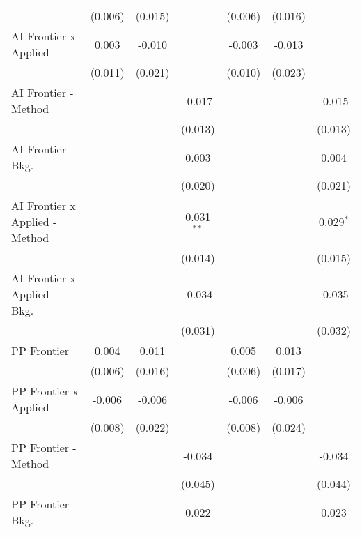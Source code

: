 \begin{tabular}{lcccccc}
                                  & (0.006) & (0.015)     &                & (0.006) & (0.016)  &   \\   
   AI Frontier x Applied          & 0.003   & -0.010      &                & -0.003  & -0.013   &   \\   
                                  & (0.011) & (0.021)     &                & (0.010) & (0.023)  &   \\   
   AI Frontier - Method           &         &             & -0.017         &         &          & -0.015\\   
                                  &         &             & (0.013)        &         &          & (0.013)\\   
   AI Frontier - Bkg.             &         &             & 0.003          &         &          & 0.004\\   
                                  &         &             & (0.020)        &         &          & (0.021)\\   
   AI Frontier x Applied - Method &         &             & 0.031$^{**}$   &         &          & 0.029$^{*}$\\   
                                  &         &             & (0.014)        &         &          & (0.015)\\   
   AI Frontier x Applied - Bkg.   &         &             & -0.034         &         &          & -0.035\\   
                                  &         &             & (0.031)        &         &          & (0.032)\\   
   PP Frontier                    & 0.004   & 0.011       &                & 0.005   & 0.013    &   \\   
                                  & (0.006) & (0.016)     &                & (0.006) & (0.017)  &   \\   
   PP Frontier x Applied          & -0.006  & -0.006      &                & -0.006  & -0.006   &   \\   
                                  & (0.008) & (0.022)     &                & (0.008) & (0.024)  &   \\   
   PP Frontier - Method           &         &             & -0.034         &         &          & -0.034\\   
                                  &         &             & (0.045)        &         &          & (0.044)\\   
   PP Frontier - Bkg.             &         &             & 0.022          &         &          & 0.023\\   

\end{tabular}
